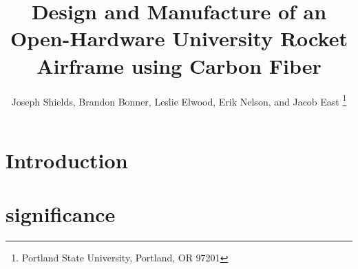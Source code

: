 \documentclass{aiaa-tc}%
\title{Design and Manufacture of an Open-Hardware 
 	University Rocket Airframe using Carbon Fiber}
\author{
Joseph Shields, Brandon Bonner, Leslie Elwood, Erik Nelson, and Jacob East
	\thanks{Portland State University, Portland, OR 97201}
 }
\begin{document}
\maketitle
\begin{abstract}

\end{abstract}


\section{Introduction}

\section{significance}
\end{document}
